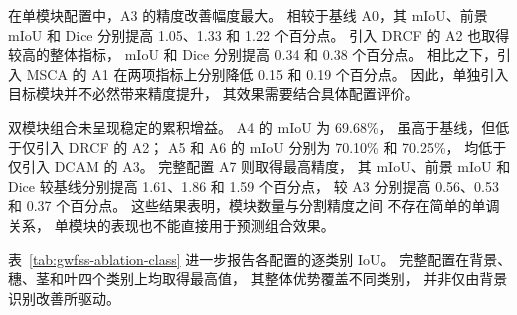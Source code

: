 在单模块配置中，A3 的精度改善幅度最大。
相较于基线 A0，其 mIoU、前景 mIoU 和 Dice
分别提高 1.05、1.33 和 1.22 个百分点。
引入 DRCF 的 A2 也取得较高的整体指标，
mIoU 和 Dice 分别提高 0.34 和 0.38 个百分点。
相比之下，引入 MSCA 的 A1
在两项指标上分别降低 0.15 和 0.19 个百分点。
因此，单独引入目标模块并不必然带来精度提升，
其效果需要结合具体配置评价。

双模块组合未呈现稳定的累积增益。
A4 的 mIoU 为 69.68\%，
虽高于基线，但低于仅引入 DRCF 的 A2；
A5 和 A6 的 mIoU 分别为 70.10\% 和 70.25\%，
均低于仅引入 DCAM 的 A3。
完整配置 A7 则取得最高精度，
其 mIoU、前景 mIoU 和 Dice
较基线分别提高 1.61、1.86 和 1.59 个百分点，
较 A3 分别提高 0.56、0.53 和 0.37 个百分点。
这些结果表明，模块数量与分割精度之间
不存在简单的单调关系，
单模块的表现也不能直接用于预测组合效果。

表~\ref{tab:gwfss-ablation-class}
进一步报告各配置的逐类别 IoU。
完整配置在背景、穗、茎和叶四个类别上均取得最高值，
其整体优势覆盖不同类别，
并非仅由背景识别改善所驱动。


